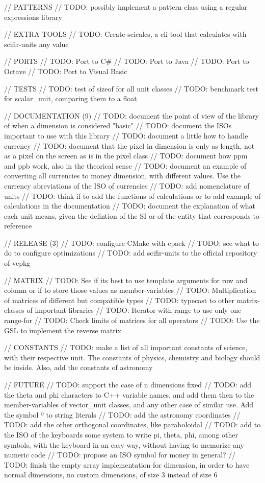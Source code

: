 // PATTERNS // TODO\+: possibly implement a pattern class using a regular expressions library

// EXTRA TOOLS // TODO\+: Create scicalcs, a cli tool that calculates with scifir-\/units any value

// PORTS // TODO\+: Port to C\# // TODO\+: Port to Java // TODO\+: Port to Octave // TODO\+: Port to Visual Basic

// TESTS // TODO\+: test of sizeof for all unit classes // TODO\+: benchmark test for scalar\+\_\+unit, comparing them to a float

// DOCUMENTATION (9) // TODO\+: document the point of view of the library of when a dimension is considered "{}basic"{} // TODO\+: document the ISOs important to use with this library // TODO\+: document a little how to handle currency // TODO\+: document that the pixel in dimension is only as length, not as a pixel on the screen as is in the pixel class // TODO\+: document how ppm and ppb work, also in the theorical sense // TODO\+: document an example of converting all currencies to money dimension, with different values. Use the currency abreviations of the ISO of currencies // TODO\+: add nomenclature of units // TODO\+: think if to add the functions of calculations or to add example of calculations in the documentation // TODO\+: document the explanation of what each unit means, given the defintion of the SI or of the entity that corresponds to reference

// RELEASE (3) // TODO\+: configure CMake with cpack // TODO\+: see what to do to configure optimizations // TODO\+: add scifir-\/units to the official repository of vcpkg

// MATRIX // TODO\+: See if it\textquotesingle{}s best to use template arguments for row and column or if to store those values as member-\/variables // TODO\+: Multiplication of matrices of different but compatible types // TODO\+: typecast to other matrix-\/classes of important libraries // TODO\+: Iterator with range to use only one range-\/for // TODO\+: Check limits of matrices for all operators // TODO\+: Use the GSL to implement the reverse matrix

// CONSTANTS // TODO\+: make a list of all important constants of science, with their respective unit. The constants of physics, chemistry and biology should be inside. Also, add the constants of astronomy

// FUTURE // TODO\+: support the case of n dimensions fixed // TODO\+: add the theta and phi characters to C++ variable names, and add them then to the member-\/variables of vector\+\_\+unit classes, and any other case of similar use. Add the symbol º to string literals // TODO\+: add the astronomy coordinates // TODO\+: add the other orthogonal coordinates, like paraboloidal // TODO\+: add to the ISO of the keyboards some system to write pi, theta, phi, among other symbols, with the keyboard in an easy way, without having to memorize any numeric code // TODO\+: propose an ISO symbol for money in general? // TODO\+: finish the empty array implementation for dimension, in order to have normal dimensions, no custom dimensions, of size 3 instead of size 6

